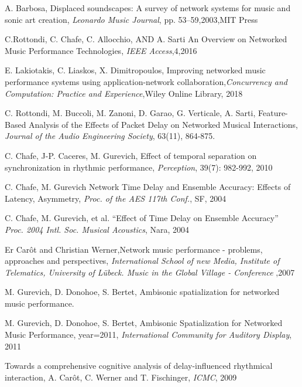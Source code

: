   A. Barbosa, Displaced soundscapes: A survey of network systems for music and sonic art creation,
  \emph{Leonardo Music Journal},
  pp. 53--59,2003,MIT Press




C.Rottondi, C. Chafe, C. Allocchio, AND A. Sarti
An Overview on Networked Music Performance Technologies, \emph{IEEE Access},4,2016



E. Lakiotakis, C. Liaskos, X. Dimitropoulos, Improving networked music performance systems using application-network collaboration,\emph{Concurrency and Computation: Practice and Experience},Wiley Online Library, 2018

C. Rottondi, M. Buccoli, M. Zanoni, D. Garao,  G. Verticale, A. Sarti,  Feature-Based Analysis of the Effects of Packet Delay on Networked Musical Interactions, \emph{Journal of the Audio Engineering Society}, 63(11), 864-875.



C. Chafe, J-P. Caceres, M. Gurevich, Effect of temporal separation on synchronization in rhythmic performance,
\emph{Perception}, 39(7): 982-992, 2010

C. Chafe, M. Gurevich Network Time Delay and Ensemble Accuracy: Effects of Latency, Asymmetry,
\emph{Proc. of the AES 117th Conf.}, SF, 2004

C. Chafe, M. Gurevich, et al. “Effect of Time Delay on Ensemble Accuracy”
\emph{Proc. 2004 Intl. Soc. Musical Acoustics}, Nara, 2004



Er Car\^ot and Christian Werner,Network music performance - problems, approaches and perspectives,
    \emph{International School of new Media, Institute of Telematics, University of Lübeck. Music in the Global Village - Conference}
    ,2007

M. Gurevich, D. Donohoe, S. Bertet, Ambisonic spatialization for networked music performance.


M. Gurevich, D. Donohoe, S. Bertet,
  Ambisonic Spatialization for Networked Music Performance,
  year={2011},
  \emph{International Community for Auditory Display}, 2011

 Towards a comprehensive cognitive analysis of delay-influenced rhythmical interaction,
  A. Car{\^o}t, C. Werner and T. Fischinger,
  \emph{ICMC},
  2009

